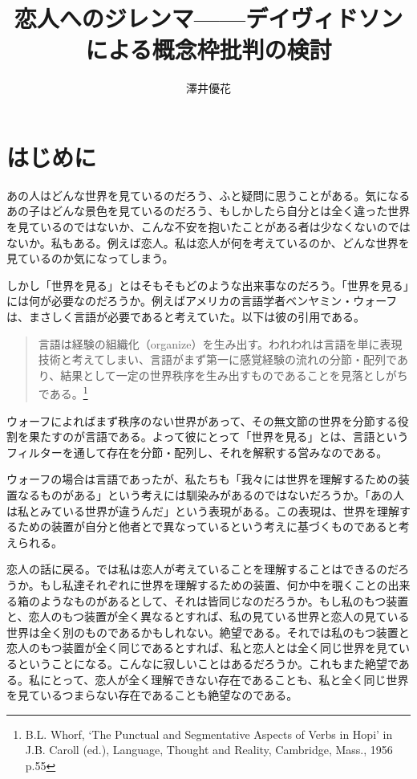 \documentclass[b5j,twoside,twocolumn]{utarticle}
\title{\tbaselineshift =4.0pt 恋人へのジレンマ------デイヴィドソンによる概念枠批判の検討}
\author{澤井優花}
\date{\vspace{-5mm}}
\makeatletter
\def\yakuchu{%
\@ifnextchar[\@xfootnote %
{\stepcounter{yakuchu}%
\protected@xdef\@thefnmark{\theyakuchu}%
\@footnotemark\@footnotetext}}
\makeatother
\begin{document}
\maketitle

\setlength{\footskip}{-2mm}
\chead[]{}
\lfoot[]{\thepage{}}
\cfoot[]{}
\rfoot[\thepage{}]{}

\tbaselineshift =3.0pt
\let\yakuchu=\endnote
\renewcommand{\footnoterule}{\noindent\rule{100mm}{0.3mm}\vskip2mm}
\thispagestyle{fancy}
\section{はじめに}
あの人はどんな世界を見ているのだろう、ふと疑問に思うことがある。気になるあの子はどんな景色を見ているのだろう、もしかしたら自分とは全く違った世界を見ているのではないか、こんな不安を抱いたことがある者は少なくないのではないか。私もある。例えば恋人。私は恋人が何を考えているのか、どんな世界を見ているのか気になってしまう。


しかし「世界を見る」とはそもそもどのような出来事なのだろう。「世界を見る」には何が必要なのだろうか。例えばアメリカの言語学者ベンヤミン・ウォーフは、まさしく言語が必要であると考えていた。以下は彼の引用である。


\begin{quote}
言語は経験の組織化（organize）を生み出す。われわれは言語を単に表現技術と考えてしまい、言語がまず第一に感覚経験の流れの分節・配列であり、結果として一定の世界秩序を生み出すものであることを見落としがちである。\footnote{B.L. Whorf, ‘The Punctual and Segmentative Aspects of Verbs in Hopi’ in J.B. Caroll (ed.), Language, Thought and Reality, Cambridge, Mass., 1956 p.55}
\end{quote}


ウォーフによればまず秩序のない世界があって、その無文節の世界を分節する役割を果たすのが言語である。よって彼にとって「世界を見る」とは、言語というフィルターを通して存在を分節・配列し、それを解釈する営みなのである。


ウォーフの場合は言語であったが、私たちも「我々には世界を理解するための装置なるものがある」という考えには馴染みがあるのではないだろうか。「あの人は私とみている世界が違うんだ」という表現がある。この表現は、世界を理解するための装置が自分と他者とで異なっているという考えに基づくものであると考えられる。


恋人の話に戻る。では私は恋人が考えていることを理解することはできるのだろうか。もし私達それぞれに世界を理解するための装置、何か中を覗くことの出来る箱のようなものがあるとして、それは皆同じなのだろうか。もし私のもつ装置と、恋人のもつ装置が全く異なるとすれば、私の見ている世界と恋人の見ている世界は全く別のものであるかもしれない。絶望である。それでは私のもつ装置と恋人のもつ装置が全く同じであるとすれば、私と恋人とは全く同じ世界を見ているということになる。こんなに寂しいことはあるだろうか。これもまた絶望である。私にとって、恋人が全く理解できない存在であることも、私と全く同じ世界を見ているつまらない存在であることも絶望なのである。
\end{document}
